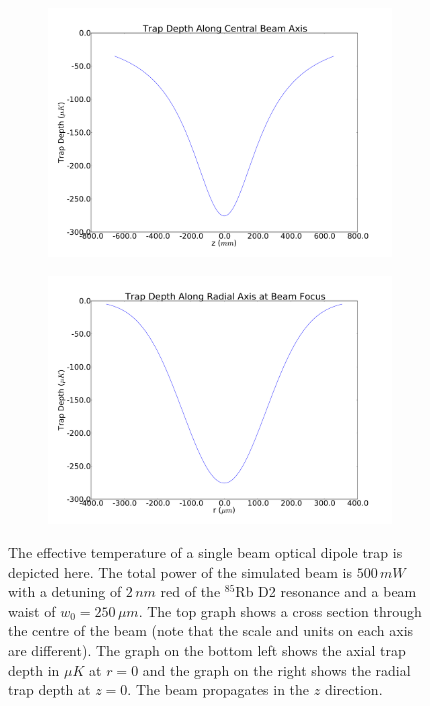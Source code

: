 \begin{figure}[H]
\begin{subfigure}[b]{0.5\textwidth}
\includegraphics[width=\textwidth]{figs/longtrapdepth.pdf}
\end{subfigure}\begin{subfigure}[b]{0.5\textwidth}
\includegraphics[width=\textwidth]{figs/radtrapdepth.pdf}
\end{subfigure}

\caption{The effective temperature of a single beam optical dipole trap is depicted here. The total power of the simulated beam is $500\,\unit{mW}$ with a detuning of $2\,\unit{nm}$ red of the $^{85}$Rb D2 resonance and a beam waist of $w_0=250\,\unit{\mu m}$. The top graph shows a cross section through the centre of the beam (note that the scale and units on each axis are different). The graph on the bottom left shows the axial trap depth in $\mu K$ at $r=0$ and the graph on the right shows the radial trap depth at $z=0$. The beam propagates in the $z$ direction.}
\label{fig:dipolepotential}
\end{figure}

